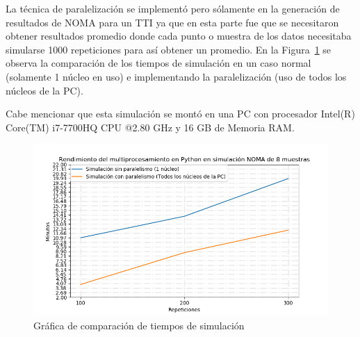 La técnica de paralelización se implementó pero sólamente en la generación de resultados de NOMA para un TTI ya que en esta parte fue que se necesitaron obtener resultados promedio donde cada punto o muestra de los datos necesitaba simularse 1000 repeticiones para así obtener un promedio. En la Figura~\ref{fig:SIMmultiprocessing} se observa la comparación de los tiempos de simulación en un caso normal (solamente 1 núcleo en uso) e implementando la paralelización (uso de todos los núcleos de la PC).\newline

Cabe mencionar que esta simulación se montó en una PC con procesador Intel(R) Core(TM) i7-7700HQ CPU @2.80 GHz y 16 GB de Memoria RAM.

\begin{figure}[th]
    \centering
    \includegraphics[scale=.7]{Figures/MultiprocesamientoSIM.png}
    \decoRule
    \caption[Gráfica de comparación de tiempos de simulación]{Gráfica de comparación de tiempos de simulación}
    \label{fig:SIMmultiprocessing}
\end{figure}